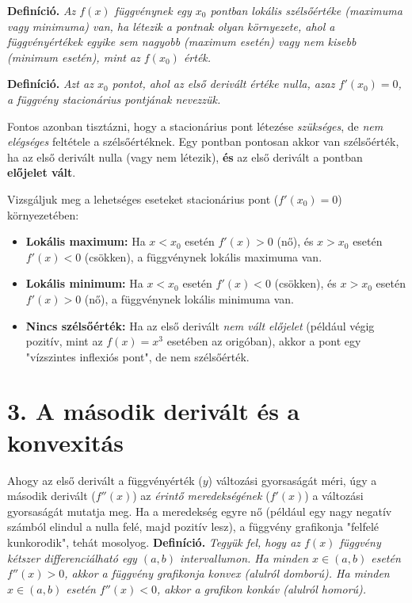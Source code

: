 \documentclass[12pt,a4paper]{article}
\begin{document}
\textbf{Definíció.} \textit{Az $f(x)$ függvénynek egy $x_0$ pontban \textcolor{bvred}{lokális szélsőértéke} (maximuma vagy minimuma) van, ha létezik a pontnak olyan környezete, ahol a függvényértékek egyike sem nagyobb (maximum esetén) vagy nem kisebb (minimum esetén), mint az $f(x_0)$ érték.}

\textbf{Definíció.} \textit{Azt az $x_0$ pontot, ahol az első derivált értéke nulla, azaz $f'(x_0) = 0$, a függvény \textcolor{bvred}{stacionárius pontjának} nevezzük.}

Fontos azonban tisztázni, hogy a stacionárius pont létezése \textit{szükséges}, de \textit{nem elégséges} feltétele a szélsőértéknek. Egy pontban pontosan akkor van szélsőérték, ha az első derivált nulla (vagy nem létezik), \textbf{és} az első derivált a pontban \textbf{előjelet vált}.

Vizsgáljuk meg a lehetséges eseteket stacionárius pont ($f'(x_0) = 0$) környezetében:
\begin{itemize}
    \item \textbf{Lokális maximum:} Ha $x < x_0$ esetén $f'(x) > 0$ (nő), és $x > x_0$ esetén $f'(x) < 0$ (csökken), a függvénynek lokális maximuma van.
    \item \textbf{Lokális minimum:} Ha $x < x_0$ esetén $f'(x) < 0$ (csökken), és $x > x_0$ esetén $f'(x) > 0$ (nő), a függvénynek lokális minimuma van.
    \item \textbf{Nincs szélsőérték:} Ha az első derivált \textit{nem vált előjelet} (például végig pozitív, mint az $f(x)=x^3$ esetében az origóban), akkor a pont egy "vízszintes inflexiós pont", de nem szélsőérték.
\end{itemize}

\section*{3. A második derivált és a konvexitás}

Ahogy az első derivált a függvényérték ($y$) változási gyorsaságát méri, úgy a második derivált ($f''(x)$) az \textit{érintő meredekségének} ($f'(x)$) a változási gyorsaságát mutatja meg. Ha a meredekség egyre nő (például egy nagy negatív számból elindul a nulla felé, majd pozitív lesz), a függvény grafikonja "felfelé kunkorodik", tehát mosolyog.
\textbf{Definíció.} \textit{Tegyük fel, hogy az $f(x)$ függvény kétszer differenciálható egy $(a,b)$ intervallumon. Ha minden $x \in (a,b)$ esetén $f''(x) > 0$, akkor a függvény grafikonja \textcolor{bvred}{konvex} (alulról domború). Ha minden $x \in (a,b)$ esetén $f''(x) < 0$, akkor a grafikon \textcolor{bvred}{konkáv} (alulról homorú).}
\end{document}
